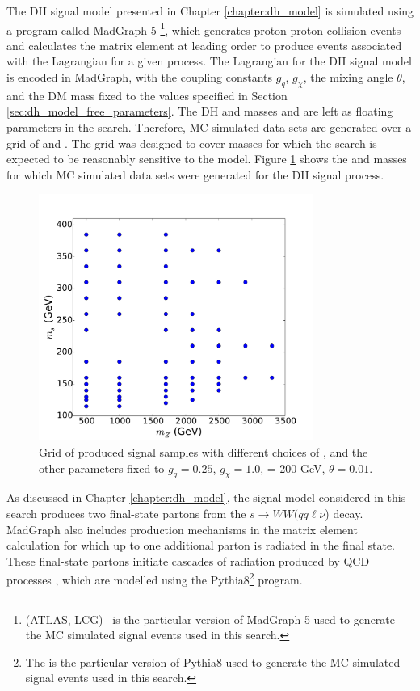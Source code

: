The DH signal model presented in Chapter \ref{chapter:dh_model} is simulated using a program called MadGraph 5 \cite{MG5}\footnote{\MGNLO[2.7.2](ATLAS, LCG)~\cite{Alwall:2014hca} is the particular version of MadGraph 5 used to generate the MC simulated signal events used in this search.}, which generates proton-proton collision events and calculates the matrix element at leading order to produce events associated with the Lagrangian for a given process. The Lagrangian for the DH signal model is encoded in MadGraph, with the coupling constants \(g_q\), \(g_\chi\), the mixing angle \(\theta\), and the DM mass \mchi fixed to the values specified in Section \ref{sec:dh_model_free_parameters}. The DH and \Zprime masses \ms and \mZp are left as floating parameters in the search. Therefore, MC simulated data sets are generated over a grid of \ms and \mZp. The grid was designed to cover masses for which the search is expected to be reasonably sensitive to the model. Figure \ref{fig:signalgrid} shows the \ms and \mZp masses for which MC simulated data sets were generated for the DH signal process. 

\begin{figure}[h]
	\centering
	\includegraphics[width=0.8\textwidth]{Figures/4/Grid.pdf}
	\caption{Grid of produced signal samples with different choices of \mZp, \ms and the other parameters fixed to \(g_{q}=0.25\), \(g_{\chi} = 1.0\), \mchi = 200 GeV, \(\theta = 0.01\).}
	\label{fig:signalgrid}
\end{figure}

As discussed in Chapter \ref{chapter:dh_model}, the signal model considered in this search produces two final-state partons from the \(s \rightarrow WW(qq\ell\nu\)) decay. MadGraph also includes production mechanisms in the matrix element calculation for which up to one additional parton is radiated in the final state. These final-state partons initiate cascades of radiation produced by QCD processes \cite{parton_shower}, which are modelled using the Pythia8\footnote{The \PYTHIA[8.230]\cite{Sjostrand:2014zea} is the particular version of Pythia8 used to generate the MC simulated signal events used in this search.} program.

